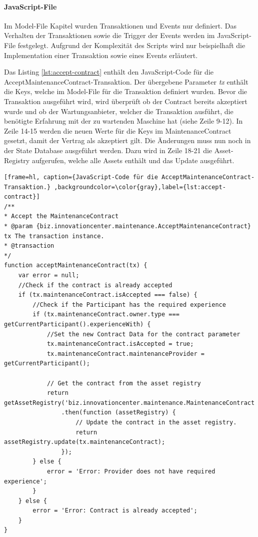 \paragraph{JavaScript-File}
Im Model-File Kapitel wurden Transaktionen und Events nur definiert. Das Verhalten der Transaktionen sowie die Trigger der Events werden im JavaScript-File festgelegt. Aufgrund der Komplexität des Scripts wird nur beispielhaft die Implementation einer Transaktion sowie eines Events erläutert.

Das Listing \ref{lst:accept-contract} enthält den JavaScript-Code für die AcceptMaintenanceContract-Transaktion. Der übergebene Parameter \textit{tx} enthält die Keys, welche im Model-File für die Transaktion definiert wurden. Bevor die Transaktion ausgeführt wird, wird überprüft ob der Contract bereits akzeptiert wurde und ob der Wartungsanbieter, welcher die Transaktion ausführt, die benötigte Erfahrung mit der zu wartenden Maschine hat (siehe Zeile 9-12). In Zeile 14-15 werden die neuen Werte für die Keys im MaintenanceContract gesetzt, damit der Vertrag als akzeptiert gilt. Die Änderungen muss nun noch in der State Database ausgeführt werden. Dazu wird in Zeile 18-21 die Asset-Registry aufgerufen, welche alle Assets enthält und das Update ausgeführt.


\begin{lstfloat}
\begin{lstlisting}[frame=hl, caption={JavaScript-Code für die AcceptMaintenanceContract-Transaktion.} ,backgroundcolor=\color{gray},label={lst:accept-contract}]
/**
* Accept the MaintenanceContract
* @param {biz.innovationcenter.maintenance.AcceptMaintenanceContract} tx The transaction instance.
* @transaction
*/
function acceptMaintenanceContract(tx) {
    var error = null;
    //Check if the contract is already accepted
    if (tx.maintenanceContract.isAccepted === false) {
        //Check if the Participant has the required experience
        if (tx.maintenanceContract.owner.type === getCurrentParticipant().experienceWith) {
            //Set the new Contract Data for the contract parameter
            tx.maintenanceContract.isAccepted = true;
            tx.maintenanceContract.maintenanceProvider = getCurrentParticipant();

            // Get the contract from the asset registry
            return getAssetRegistry('biz.innovationcenter.maintenance.MaintenanceContract')
                .then(function (assetRegistry) {
                    // Update the contract in the asset registry.
                    return assetRegistry.update(tx.maintenanceContract);
                });
        } else {
            error = 'Error: Provider does not have required experience';
        }
    } else {
        error = 'Error: Contract is already accepted';
    }
}
\end{lstlisting} 
\end{lstfloat}

